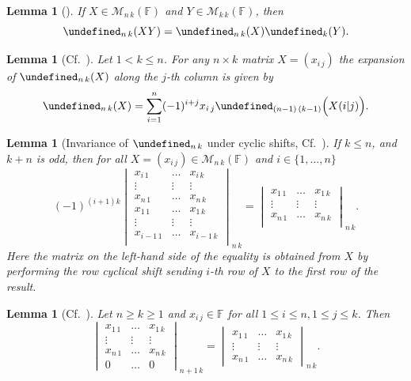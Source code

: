\documentclass{elsarticle}
\def\F{{\mathbb F}}
\def\M{{\mathcal M}}
\let\det\undefined
\DeclareMathOperator{\det}{det}
\theoremstyle{plain}
\newtheorem{lemma}[theorem]{Lemma}
\theoremstyle{definition}
\numberwithin{equation}{section}
\begin{document}
\begin{lemma}[{\cite[Corollary~2.8]{Guterman2025}}]\label{lem:rightmatrixmult}If $X \in \M_{n\,k}(\F)$ and $Y \in \M_{k\,k}(\F)$, then
\[
\det_{n\,k}(XY) =  \det_{n\,k}(X)\det_k(Y).
\]
\end{lemma}



\begin{lemma}[{Cf.~\cite[Theorem~16]{NAKAGAMI2007422}}]\label{lem:DetNKLaplaceExp}
Let $1 < k \le n$. For any $n \times k$ matrix $X = (x_{i\,j})$ the expansion of $\det_{n\,k}(X)$ along the $j$-th column
is given by
\[
\det_{n\,k}(X) = \sum_{i = 1}^n (-1)^{i+j} x_{i\,j} \det_{(n-1)\,(k-1)}\Bigl(X(i|j)\Bigr).
\]
\end{lemma}





\begin{lemma}[{Invariance of $\det_{n\,k}$ under cyclic shifts, Cf.~\cite[Theorem 3.5]{amiri2010}}]\label{lem:PermKNOddCyclic}If $k \le n$, and $k + n$ is odd, then for all $X = (x_{i\,j}) \in \M_{n\,k}(\F)$ and $i \in \{1, \ldots, n\}$ 
\[
(-1)^{(i+1)k}
\begin{vmatrix}
x_{i\,1} & \ldots & x_{i\,k}\\
\vdots & \vdots & \vdots\\
x_{n\,1} & \ldots & x_{n\,k}\\
x_{1\,1} & \ldots & x_{1\,k}\\
  \vdots & \vdots & \vdots\\
x_{i-1\,1} & \ldots & x_{i-1\,k}\\
\end{vmatrix}_{n\,k} =
\begin{vmatrix}
x_{1\,1} & \ldots & x_{1\,k}\\
  \vdots & \vdots & \vdots\\
x_{n\,1} & \ldots & x_{n\,k}\\
\end{vmatrix}_{n\,k}.
\]
Here the matrix on the left-hand side of the equality is obtained from $X$ by performing the row cyclical shift sending $i$-th row of $X$ to the first row of the result.
\end{lemma}


\begin{lemma}[{Cf.~\cite[Lemma 3.2]{amiri2010}}]\label{lem:AMIRILEMMA32} Let $n \ge k \ge 1$ and $x_{i\,j} \in \F$ for all $1 \le i \le n, 1 \le j \le k$. Then
\[
\begin{vmatrix}
x_{1\,1} & \ldots & x_{1\,k}\\
\vdots & \vdots & \vdots\\
x_{n\,1} & \ldots & x_{n\,k}\\
0 & \ldots & 0
\end{vmatrix}_{n+1\,k} = 
\begin{vmatrix}
x_{1\,1} & \ldots & x_{1\,k}\\
\vdots & \vdots & \vdots\\
x_{n\,1} & \ldots & x_{n\,k}
\end{vmatrix}_{n\,k}.
\]
\end{lemma}
\end{document}
